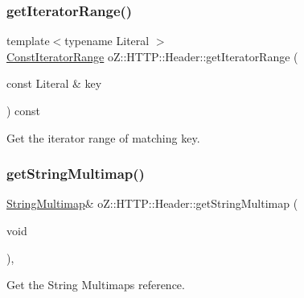 \subsubsection{\texorpdfstring{getIteratorRange()}{getIteratorRange()}\hspace{0.1cm}{\footnotesize\ttfamily [2/2]}}
{\footnotesize\ttfamily template$<$typename Literal $>$ \\
\mbox{\hyperlink{classo_z_1_1_h_t_t_p_1_1_header_a0823c7353e93de315929c96457563c3d}{Const\+Iterator\+Range}} o\+Z\+::\+H\+T\+T\+P\+::\+Header\+::get\+Iterator\+Range (\begin{DoxyParamCaption}\item[{const Literal \&}]{key }\end{DoxyParamCaption}) const\hspace{0.3cm}{\ttfamily [inline]}}



Get the iterator range of matching key. 

\mbox{\label{classo_z_1_1_h_t_t_p_1_1_header_a915a52b181112582d34e0942004d4cb0}} 
\subsubsection{\texorpdfstring{getStringMultimap()}{getStringMultimap()}\hspace{0.1cm}{\footnotesize\ttfamily [1/2]}}
{\footnotesize\ttfamily \mbox{\hyperlink{namespaceo_z_1_1_h_t_t_p_a339aac279d709cfa16148ad073500fc1}{String\+Multimap}}\& o\+Z\+::\+H\+T\+T\+P\+::\+Header\+::get\+String\+Multimap (\begin{DoxyParamCaption}\item[{void}]{ }\end{DoxyParamCaption})\hspace{0.3cm}{\ttfamily [inline]}, {\ttfamily [noexcept]}}



Get the String Multimap\textquotesingle{}s reference. 

\mbox{\label{classo_z_1_1_h_t_t_p_1_1_header_af1ee1c1e6a882a605407683341e32a8f}} 
